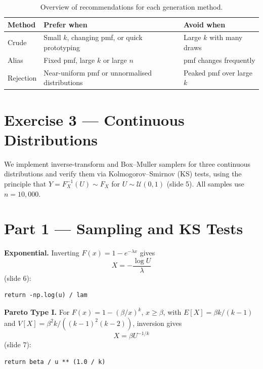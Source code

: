 \begin{table}[h]
\centering
\caption{Overview of recommendations for each generation method.}
\label{tab:recommendations}
\renewcommand{\arraystretch}{1.2}
\begin{tabular}{lp{4.2cm}p{6cm}}
\toprule
Method    & Prefer when & Avoid when \\
\midrule
Crude     & Small $k$, changing pmf, or quick prototyping  & Large $k$ with many draws \\
Alias     & Fixed pmf, large $k$ or large $n$              & pmf changes frequently \\
Rejection & Near-uniform pmf or unnormalised distributions & Peaked pmf over large $k$ \\
\bottomrule
\end{tabular}
\end{table}

\newpage 
\section*{Exercise 3 --- Continuous Distributions}

We implement inverse-transform and Box--Muller samplers for three continuous
distributions and verify them via Kolmogorov--Smirnov (KS) tests, using the
principle that $Y = F_X^{-1}(U) \sim F_X$ for $U \sim \mathcal{U}(0,1)$
(slide 5). All
samples use $n = 10{,}000$.

\section*{Part 1 --- Sampling and KS Tests}

\textbf{Exponential.} Inverting $F(x) = 1 - e^{-\lambda x}$ gives
\begin{equation}
    X = -\frac{\log U}{\lambda}
    \label{eq:exp}
\end{equation}
(slide 6):
\begin{verbatim}
return -np.log(u) / lam
\end{verbatim}

\textbf{Pareto Type I.} For $F(x) = 1 - (\beta/x)^k$, $x \geq \beta$, with
$E[X] = \beta k/(k-1)$ and $V[X] = \beta^2 k / ((k-1)^2(k-2))$, inversion gives
\begin{equation}
    X = \beta U^{-1/k}
    \label{eq:pareto}
\end{equation}
(slide 7):
\begin{verbatim}
return beta / u ** (1.0 / k)
\end{verbatim}

